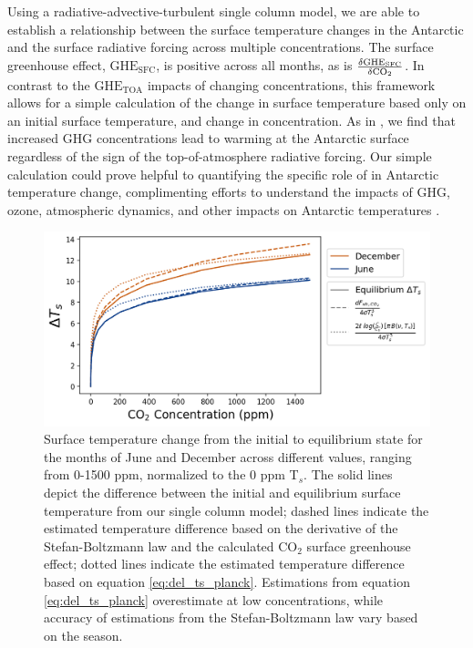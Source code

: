 \documentclass[draft]{agujournal2019}
\begin{document}
Using a radiative-advective-turbulent single column model, we are able to establish a relationship between the surface temperature changes in the Antarctic and the surface radiative forcing across multiple  concentrations. The  surface greenhouse effect, $\text{GHE}_\text{{SFC}}$, is positive across all months, as is $\frac{\delta{\text{GHE}_\text{{SFC}}}}{\delta\ce{CO_2}}$. In contrast to the $\text{GHE}_\text{{TOA}}$ impacts of changing  concentrations, this framework allows for a simple calculation of the change in surface temperature based only on an initial surface temperature, and change in  concentration. As in , we find that increased GHG concentrations lead to warming at the Antarctic surface regardless of the sign of the top-of-atmosphere radiative forcing. Our simple calculation could prove helpful to quantifying the specific role of  in Antarctic temperature change, complimenting efforts to understand the impacts of GHG, ozone, atmospheric dynamics, and other impacts on Antarctic temperatures \cite{shindell_southern_2004, thompson_signatures_2011}.

\begin{figure}[htb!]
\noindent\includegraphics[width=1\textwidth]{figures/delta_Ts.png}
\centering
\caption{Surface temperature change from the initial to equilibrium state for the months of June and December across different  values, ranging from 0-1500 ppm, normalized to the 0 ppm T$_s$. The solid lines depict the difference between the initial and equilibrium surface temperature from our single column model; dashed lines indicate the estimated temperature difference based on the derivative of the Stefan-Boltzmann law and the calculated CO$_2$ surface greenhouse effect; dotted lines indicate the estimated temperature difference based on equation \ref{eq:del_ts_planck}. Estimations from equation \ref{eq:del_ts_planck} overestimate at low  concentrations, while accuracy of estimations from the Stefan-Boltzmann law vary based on the season.}
\label{fig:delta_ts}
\end{figure}
\end{document}
